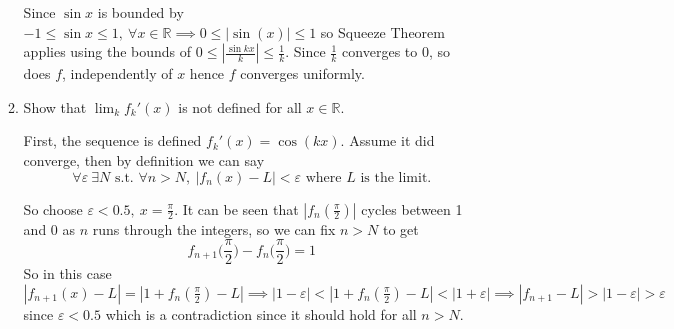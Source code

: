 \documentclass{article}
\begin{document}
\begin{enumerate}[label=(\arabic*)]
\begin{enumerate}
                Since $\sin x$ is bounded by $-1\leq \sin x \leq 1, \: \forall x \in \mathbb{R} \implies 0 \leq | \sin(x) | \leq 1$ so Squeeze Theorem applies using the bounds of $0 \leq |\frac{\sin kx}{k}| \leq \frac{1}{k}$. Since $\frac{1}{k}$ converges to 0, so does $f$, independently of $x$ hence $f$ converges uniformly.
            \item Show that $\lim_k f_k'(x)$ is not defined for all $x \in \mathbb{R}$.

                First, the sequence is defined $f_k'(x) = \cos(kx)$. Assume it did converge, then by definition we can say \[\forall \varepsilon \ \exists N \text{ s.t. } \forall n > N,\ |f_n(x) - L| < \varepsilon \text{ where $L$ is the limit.}\]
                
                So choose $\varepsilon < 0.5,\ x = \frac{\pi}{2}$. It can be seen that $|f_n(\frac{\pi}{2})|$ cycles between 1 and 0 as $n$ runs through the integers, so we can fix $n > N$ to get 
                \[f_{n+1}\Big(\frac{\pi}{2}\Big) - f_n\Big(\frac{\pi}{2}\Big) = 1\] 
                So in this case $|f_{n+1}(x) -L| = |1 + f_n(\frac{\pi}{2}) - L| \implies |1 - \varepsilon| < |1 + f_n(\frac{\pi}{2}) - L| < |1 + \varepsilon| \implies |f_{n+1} - L| > |1 - \varepsilon| > \varepsilon $ since $\varepsilon < 0.5$ which is a contradiction since it should hold for all $n > N$.
        \end{enumerate}    
\end{enumerate}
\end{document}
